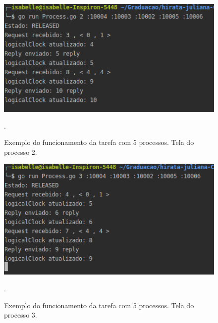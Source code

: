 \documentclass[conference]{IEEEtran}
\begin{document}
\begin{figure}[H]
\centering
\centerline{\includegraphics[scale=0.4]{imagens/ex2-proc2.png}}
\caption{Exemplo do funcionamento da tarefa com 5 processos. Tela do processo 2.}.
\label{ex2-proc2}
\end{figure}

\begin{figure}[H]
\centering
\centerline{\includegraphics[scale=0.4]{imagens/ex2-proc3.png}}
\caption{Exemplo do funcionamento da tarefa com 5 processos. Tela do processo 3.}.
\label{ex2-proc3}
\end{figure}
\end{document}
